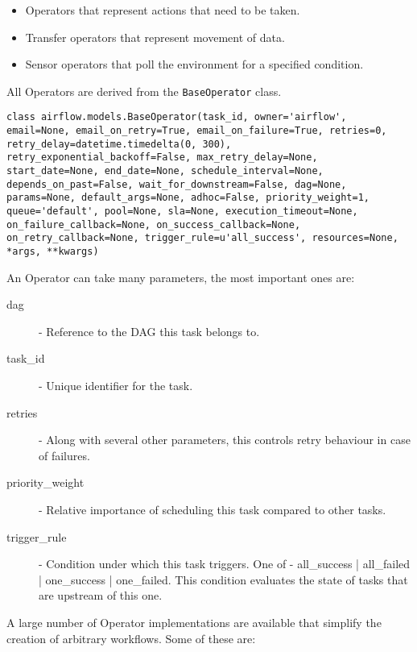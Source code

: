 \begin{itemize}
\item Operators that represent actions that need to be taken.
\item Transfer operators that represent movement of data.
\item Sensor operators that poll the environment for a specified condition.
\end{itemize} 

All Operators are derived from the \texttt{BaseOperator} class.

\begin{verbatim}
class airflow.models.BaseOperator(task_id, owner='airflow', email=None, email_on_retry=True, email_on_failure=True, retries=0, retry_delay=datetime.timedelta(0, 300), retry_exponential_backoff=False, max_retry_delay=None, start_date=None, end_date=None, schedule_interval=None, depends_on_past=False, wait_for_downstream=False, dag=None, params=None, default_args=None, adhoc=False, priority_weight=1, queue='default', pool=None, sla=None, execution_timeout=None, on_failure_callback=None, on_success_callback=None, on_retry_callback=None, trigger_rule=u'all_success', resources=None, *args, **kwargs)
\end{verbatim}
\newpage
An Operator can take many parameters, the most important ones are:

\begin{description}
\item [dag] - Reference to the DAG this task belongs to.
\item [task\_id] - Unique identifier for the task.
\item [retries] - Along with several other parameters, this controls retry behaviour in case of failures.
\item [priority\_weight] - Relative importance of scheduling this task compared to other tasks.
\item [trigger\_rule] - Condition under which this task triggers. One of - all\_success | all\_failed | one\_success | one\_failed. This condition evaluates the state of tasks that are upstream of this one.
\end{description}

A large number of Operator implementations are available that simplify the creation of arbitrary workflows. Some of these are:

